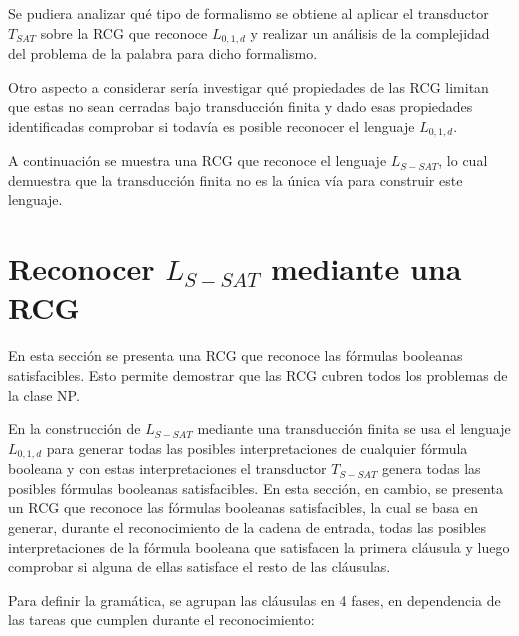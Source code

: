 Se pudiera analizar qué tipo de formalismo se obtiene al aplicar el transductor $T_{SAT}$ sobre
la RCG que reconoce $L_{0,1,d}$ y realizar un análisis de la complejidad del problema de la palabra
para dicho formalismo.

Otro aspecto a considerar sería investigar qué propiedades de las RCG limitan que estas no sean cerradas bajo transducción finita y dado esas propiedades identificadas comprobar si todavía es posible reconocer el lenguaje $L_{0,1,d}$.

A continuación se muestra una RCG que reconoce el lenguaje $L_{S-SAT}$, lo cual demuestra que la transducción
finita no es la única vía para construir este lenguaje.

\section{Reconocer $L_{S-SAT}$ mediante una RCG}

En esta sección se presenta una RCG que reconoce las fórmulas booleanas satisfacibles. Esto permite demostrar
que las RCG cubren todos los problemas de la clase NP.

En la construcción de $L_{S-SAT}$ mediante una transducción finita se usa el lenguaje $L_{0,1,d}$ para generar
todas las posibles interpretaciones de cualquier fórmula booleana y con estas interpretaciones el transductor
$T_{S-SAT}$ genera todas las posibles fórmulas booleanas satisfacibles.  En esta sección, en cambio,
se presenta un RCG que reconoce las fórmulas booleanas satisfacibles, la cual se basa en generar, durante el
reconocimiento de la cadena de entrada, todas las posibles interpretaciones de la fórmula booleana que
satisfacen la primera cláusula y luego comprobar si alguna de ellas satisface el resto de las cláusulas.

Para definir la gramática, se agrupan las cláusulas en 4 fases, en dependencia de las tareas que cumplen durante el reconocimiento:

